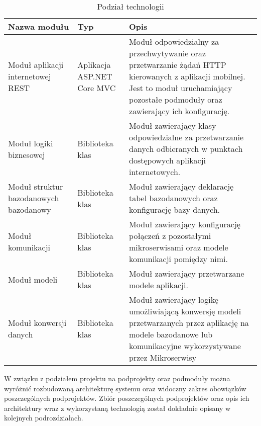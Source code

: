 {\begin{table}[htbp]
	\caption{Podział technologii}
	\label{project-architecture}
	\begin{center}
		\begin{tabular}{ | p{3cm}| p{3cm} | p{6cm} |}
			\hline Nazwa modułu & Typ &  Opis \\ \hline   
			
			\hline  Moduł aplikacji internetowej REST &  Aplikacja ASP.NET Core MVC & Moduł odpowiedzialny za przechwytywanie oraz przetwarzanie żądań HTTP kierowanych z aplikacji mobilnej. Jest to moduł uruchamiający pozostałe podmoduły oraz zawierający ich konfigurację.\\ \hline
			
			\hline  Moduł logiki biznesowej & Biblioteka klas & Moduł zawierający klasy odpowiedzialne za przetwarzanie danych odbieranych w punktach dostępowych aplikacji internetowych. \\ \hline
			
			\hline Moduł struktur bazodanowych  \mbox{bazodanowy} & Biblioteka klas & Moduł zawierający deklarację tabel bazodanowych oraz konfigurację bazy danych.\\ \hline
			
			\hline Moduł komunikacji & Biblioteka klas & Moduł zawierający konfigurację połączeń z pozostałymi mikroserwisami oraz modele komunikacji pomiędzy nimi.\\ \hline
			
			\hline Moduł modeli & Biblioteka klas & Moduł zawierający przetwarzane modele aplikacji.\\ \hline
			
			
			\hline Moduł konwersji danych & Biblioteka klas & Moduł zawierający logikę umożliwiającą konwersję modeli przetwarzanych przez aplikację na modele bazodanowe lub komunikacyjne wykorzystywane przez Mikroserwisy\\ \hline

		\end{tabular}
	\end{center}
\end{table}	

W związku z podziałem projektu na podprojekty oraz podmoduły można wyróżnić rozbudowaną architekturę systemu oraz widoczny zakres obowiązków poszczególnych podprojektów. Zbiór poszczególnych podprojektów oraz opis ich architektury wraz z wykorzystaną technologią został dokładnie opisany w kolejnych podrozdziałach.}


